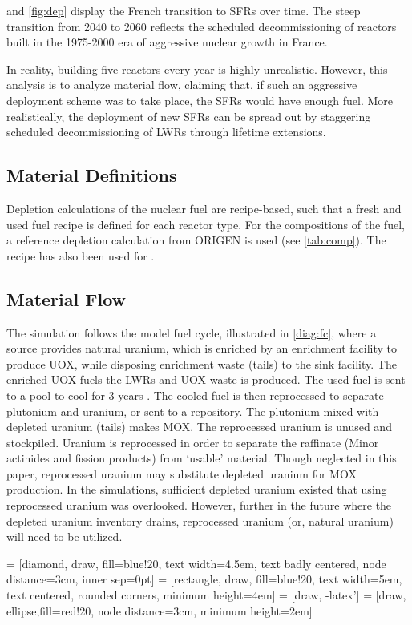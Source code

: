  and \cref{fig:dep} display
the French transition to \glspl{SFR} over time.
The steep transition from 2040 to 2060 reflects the scheduled
decommissioning of reactors built in the 1975-2000
era of aggressive nuclear growth in France.

In reality, building five reactors every year is highly unrealistic. However,
this analysis is to analyze material flow, claiming that, if such an aggressive
deployment scheme was to take place, the \glspl{SFR} would have enough fuel.
More realistically, the deployment of new \glspl{SFR} can be spread out by
staggering scheduled decommissioning of \glspl{LWR} through lifetime extensions.

\subsection{Material Definitions}
Depletion calculations of the nuclear fuel are recipe-based, such that a fresh 
and used fuel recipe is defined for each reactor type.
For the compositions of the fuel, a reference depletion calculation
from ORIGEN is used (see \cref{tab:comp}). The recipe has also been used for
\cite{wilson_adoption_2009}.


\subsection{Material Flow}
The simulation follows the model fuel cycle, illustrated in \cref{diag:fc},
where a source provides natural uranium, which is enriched by an enrichment
facility to produce \gls{UOX}, while disposing enrichment waste (tails)
to the sink facility. The enriched \gls{UOX} fuels
the \gls{LWR}s and \gls{UOX} waste is produced. The used fuel
is sent to a pool to cool for 3 years \cite{carre_overview_2009}.
The cooled fuel is then reprocessed to separate plutonium and uranium,
or sent to a repository.
The plutonium mixed with depleted uranium (tails) makes \gls{MOX}.
The reprocessed uranium is unused and stockpiled. Uranium is reprocessed
in order to separate the raffinate (Minor actinides and fission products)
from `usable' material. Though neglected in this paper, reprocessed
uranium may substitute depleted uranium for \gls{MOX} production. In the
simulations, sufficient depleted uranium existed that using reprocessed
uranium was overlooked. However, further in the future where the depleted
uranium inventory drains, reprocessed uranium (or, natural uranium) will need to be utilized. 


 = [diamond, draw, fill=blue!20, 
text width=4.5em, text badly centered, node distance=3cm, inner sep=0pt]
 = [rectangle, draw, fill=blue!20, 
text width=5em, text centered, rounded corners, minimum height=4em]
 = [draw, -latex']
 = [draw, ellipse,fill=red!20, node distance=3cm,
minimum height=2em]


